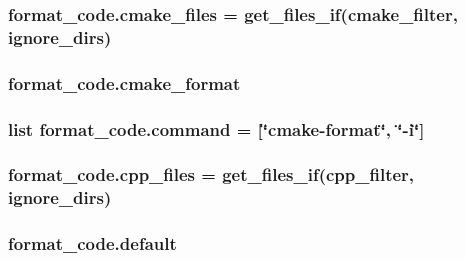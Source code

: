 \subsubsection[{\texorpdfstring{cmake\+\_\+files}{cmake_files}}]{\setlength{\rightskip}{0pt plus 5cm}format\+\_\+code.\+cmake\+\_\+files = {\bf get\+\_\+files\+\_\+if}({\bf cmake\+\_\+filter}, {\bf ignore\+\_\+dirs})}\hypertarget{namespaceformat__code_aa9bc31bd1a42202b7c10a668eb8c823a}{}\label{namespaceformat__code_aa9bc31bd1a42202b7c10a668eb8c823a}
\subsubsection[{\texorpdfstring{cmake\+\_\+format}{cmake_format}}]{\setlength{\rightskip}{0pt plus 5cm}format\+\_\+code.\+cmake\+\_\+format}\hypertarget{namespaceformat__code_a60baec6e37117c02aa32ce2f2346e28e}{}\label{namespaceformat__code_a60baec6e37117c02aa32ce2f2346e28e}
\subsubsection[{\texorpdfstring{command}{command}}]{\setlength{\rightskip}{0pt plus 5cm}list format\+\_\+code.\+command = \mbox{[}\char`\"{}cmake-\/format\char`\"{}, \char`\"{}-\/i\char`\"{}\mbox{]}}\hypertarget{namespaceformat__code_a01fc8c5f5f8fa2a4d063b8ee9d8f9049}{}\label{namespaceformat__code_a01fc8c5f5f8fa2a4d063b8ee9d8f9049}
\subsubsection[{\texorpdfstring{cpp\+\_\+files}{cpp_files}}]{\setlength{\rightskip}{0pt plus 5cm}format\+\_\+code.\+cpp\+\_\+files = {\bf get\+\_\+files\+\_\+if}({\bf cpp\+\_\+filter}, {\bf ignore\+\_\+dirs})}\hypertarget{namespaceformat__code_ab3774ae8bb3c020b3e7ccd8bba1c6810}{}\label{namespaceformat__code_ab3774ae8bb3c020b3e7ccd8bba1c6810}
\subsubsection[{\texorpdfstring{default}{default}}]{\setlength{\rightskip}{0pt plus 5cm}format\+\_\+code.\+default}\hypertarget{namespaceformat__code_a97023d650e97528eaf4498d8e9dd74dc}{}\label{namespaceformat__code_a97023d650e97528eaf4498d8e9dd74dc}
